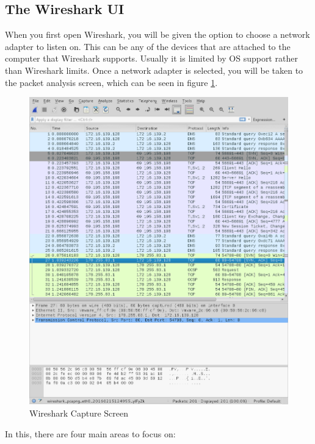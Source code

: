 		\subsection{The Wireshark UI}
			When you first open Wireshark, you will be given the option to choose a network adapter to listen on.
			This can be any of the devices that are attached to the computer that Wireshark supports.
			Usually it is limited by OS support rather than Wireshark limits.
			Once a network adapter is selected, you will be taken to the packet analysis screen, which can be seen in figure \ref{fig:WiresharkAnalysis}.
			\begin{figure}[htb]
				\centering
					\includegraphics[scale=0.33]{./WiresharkAnalysis.png}
					\caption{Wireshark Capture Screen}
					\label{fig:WiresharkAnalysis}
			\end{figure}
			In this, there are four main areas to focus on:
